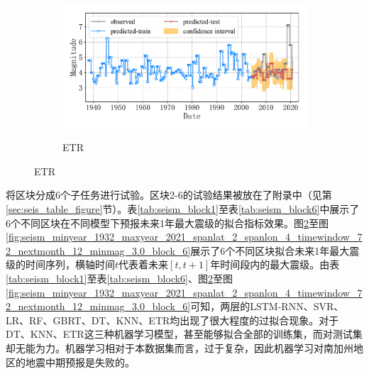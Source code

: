 \begin{figure}[!htbp]
\begin{subfigure}[b]{0.45\textwidth}
  \end{subfigure}
  ~
  \begin{subfigure}[b]{0.45\textwidth}
    \caption{ETR}
    \vspace{-0.2cm}
    \includegraphics[width=\textwidth]{Img/chap5_seism/block1/seism_etr_minyear_1932_maxyear_2021_spanlat_2_spanlon_4_timewindow_72_nextmonth_12_minmag_3.0_block_1.pdf}
    \vspace{-1cm}
    \label{fig:seism_etr_minyear_1932_maxyear_2021_spanlat_2_spanlon_4_timewindow_72_nextmonth_12_minmag_3.0_block_1}
  \end{subfigure}
  \label{fig:seism_minyear_1932_maxyear_2021_spanlat_2_spanlon_4_timewindow_72_nextmonth_12_minmag_3.0_block_1}
\end{figure}

将区块分成6个子任务进行试验。区块2-6的试验结果被放在了附录中（见第\ref{sec:seis_table_figure}节）。表\ref{tab:seism_block1}至表\ref{tab:seism_block6}中展示了6个不同区块在不同模型下预报未来1年最大震级的拟合指标效果。图\ref{fig:seism_minyear_1932_maxyear_2021_spanlat_2_spanlon_4_timewindow_72_nextmonth_12_minmag_3.0_block_1}至图\ref{fig:seism_minyear_1932_maxyear_2021_spanlat_2_spanlon_4_timewindow_72_nextmonth_12_minmag_3.0_block_6}展示了6个不同区块拟合未来1年最大震级的时间序列，横轴时间$t$代表着未来$[t,t+1]$年时间段内的最大震级。由表\ref{tab:seism_block1}至表\ref{tab:seism_block6}、图\ref{fig:seism_minyear_1932_maxyear_2021_spanlat_2_spanlon_4_timewindow_72_nextmonth_12_minmag_3.0_block_1}至图\ref{fig:seism_minyear_1932_maxyear_2021_spanlat_2_spanlon_4_timewindow_72_nextmonth_12_minmag_3.0_block_6}可知，两层的LSTM-RNN、SVR、LR、RF、GBRT、DT、KNN、ETR均出现了很大程度的过拟合现象。对于DT、KNN、ETR这三种机器学习模型，甚至能够拟合全部的训练集，而对测试集却无能为力。机器学习相对于本数据集而言，过于复杂，因此机器学习对南加州地区的地震中期预报是失败的。


